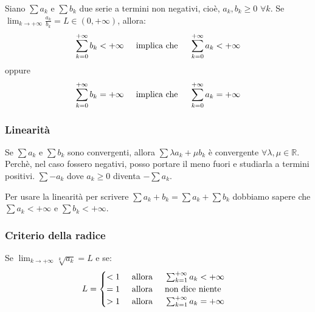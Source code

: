 \begin{thm}
    Siano $\sum a_k$ e $\sum b_k$ due serie a termini non negativi, cioè, $a_k,b_k\geq0$ $\forall k$. Se $\lim_{k\to+\infty}\frac{a_k}{b_k}=L\in(0,+\infty)$, allora:
    \begin{equation*}
        \sum^{+\infty}_{k=0}b_k<+\infty\hspace{0.5cm}\text{implica che}\hspace{0.5cm}\sum^{+\infty}_{k=0}a_k<+\infty
    \end{equation*}
    oppure 
    \begin{equation*}
        \sum^{+\infty}_{k=0}b_k=+\infty\hspace{0.5cm}\text{implica che}\hspace{0.5cm}\sum^{+\infty}_{k=0}a_k=+\infty
    \end{equation*}
\end{thm}

\subsubsection{Linearità}

Se $\sum a_k$ e $\sum b_k$ sono convergenti, allora $\sum\lambda a_k+\mu b_k$ è convergente $\forall\lambda, \mu\in\mathbb{R}$. Perchè, nel caso fossero negativi, posso portare il meno fuori e studiarla a termini positivi. $\sum-a_k$ dove $a_k\geq0$ diventa $-\sum a_k$.

Per usare la linearità per scrivere $\sum a_k+b_k=\sum a_k+\sum b_k$ dobbiamo sapere che $\sum a_k<+\infty$ e $\sum b_k<+\infty$.

\subsubsection{Criterio della radice}

Se $\lim_{k\to+\infty}\sqrt[k]{a_k}=L$ e se:
$$L=
\begin{cases}
    <1\hspace{0.5cm}\text{allora}\hspace{0.5cm}\sum^{+\infty}_{k=1}a_k<+\infty\\
    =1\hspace{0.5cm}\text{allora}\hspace{0.5cm}\text{non dice niente}\\
    >1\hspace{0.5cm}\text{allora}\hspace{0.5cm}\sum^{+\infty}_{k=1}a_k=+\infty
\end{cases}$$


